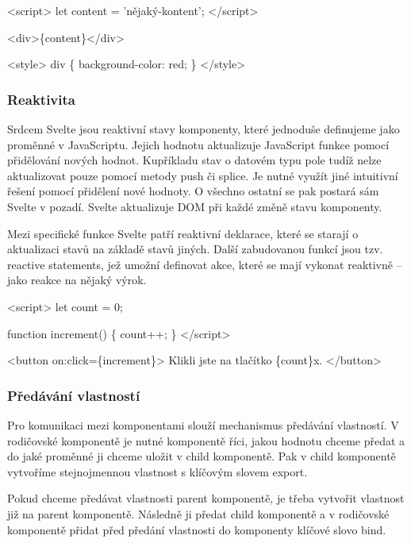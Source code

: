 \begin{prog}
<script>
  let content = 'nějaký-kontent';
</script>

<div>\{content\}</div>
  
<style>
  div \{
    background-color: red;
  \}
</style>
\end{prog}

\subsubsection{Reaktivita}

Srdcem Svelte jsou reaktivní stavy komponenty, které jednoduše definujeme jako proměnné v JavaScriptu. Jejich hodnotu aktualizuje JavaScript funkce pomocí přidělování nových hodnot. 
Kupříkladu stav o datovém typu pole tudíž nelze aktualizovat pouze pomocí metody push či splice. Je nutné využít jiné intuitivní řešení pomocí přidělení nové hodnoty.
O všechno ostatní se pak postará sám Svelte v pozadí. Svelte aktualizuje DOM při každé změně stavu komponenty. 

Mezi specifické funkce Svelte patří reaktivní deklarace, které se starají o aktualizaci stavů na základě stavů jiných. 
Další zabudovanou funkcí jsou tzv. reactive statements, jež umožní definovat akce, které se mají vykonat reaktivně -- jako reakce na nějaký výrok.\cite{sveltehandbook,svelte}

\begin{prog}
<script>
  let count = 0;

  function increment() \{
    count++;
  \}
</script>

<button on:click=\{increment\}>
  Klikli jste na tlačítko \{count\}x.
</button>
\end{prog}

\subsubsection{Předávání vlastností}

Pro komunikaci mezi komponentami slouží mechanismus předávání vlastností. 
V rodičovské komponentě je nutné komponentě říci, jakou hodnotu chceme předat a do jaké proměnné ji chceme uložit v child komponentě. 
Pak v child komponentě vytvoříme stejnojmennou vlastnost s klíčovým slovem export.

Pokud chceme předávat vlastnosti parent komponentě, je třeba vytvořit vlastnost již na parent komponentě. 
Následně ji předat child komponentě a v rodičovské komponentě přidat před předání vlastnosti do komponenty klíčové slovo bind.\cite{svelte}

